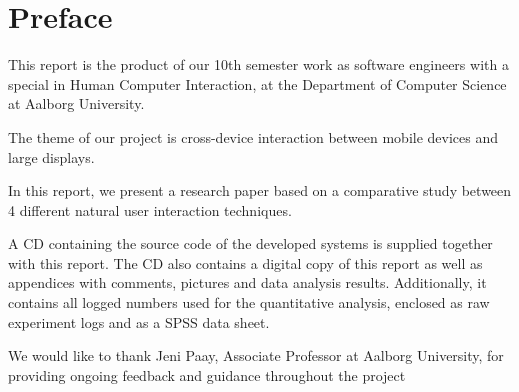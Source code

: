 \section*{Preface}\label{sec:preface}

This report is the product of our 10th semester work as software engineers with a special in Human Computer Interaction, at the Department of Computer Science at Aalborg University.

The theme of our project is cross-device interaction between mobile devices and large displays.

In this report, we present a research paper based on a comparative study between 4 different natural user interaction techniques.

A CD containing the source code of the developed systems is supplied together with this report.
The CD also contains a digital copy of this report as well as appendices with comments, pictures and data analysis results.
Additionally, it contains all logged numbers used for the quantitative analysis, enclosed as raw experiment logs and as a SPSS data sheet.

We would like to thank Jeni Paay, Associate Professor at Aalborg University, for providing ongoing feedback and guidance throughout the project